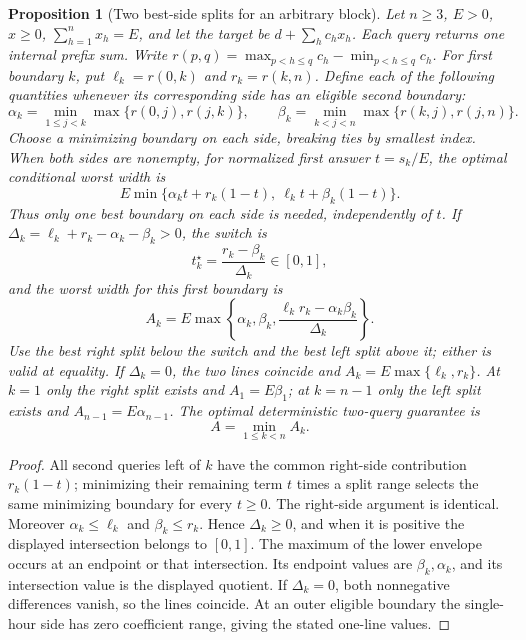 \documentclass[12pt]{article}
\newtheorem{proposition}{Proposition}
\begin{document}
\begin{proposition}[Two best-side splits for an arbitrary block]\label{prop:counter-two-query}
Let $n\geq3$, $E>0$, $x\geq0$, $\sum_{h=1}^n x_h=E$, and let the target be
$d+\sum_hc_hx_h$. Each query returns one internal prefix sum. Write
$r(p,q)=\max_{p<h\leq q}c_h-\min_{p<h\leq q}c_h$.
For first boundary $k$, put $\ell_k=r(0,k)$ and $r_k=r(k,n)$.
Define each of the following quantities whenever its corresponding
side has an eligible second boundary:
\[
 \alpha_k=\min_{1\leq j<k}\max\{r(0,j),r(j,k)\},\qquad
 \beta_k=\min_{k<j<n}\max\{r(k,j),r(j,n)\}.
\]
Choose a minimizing boundary on each side, breaking ties by smallest index.
When both sides are nonempty, for normalized first answer $t=s_k/E$,
the optimal conditional worst width is
\[
 E\min\{\alpha_k t+r_k(1-t),\ \ell_k t+\beta_k(1-t)\}.
\]
Thus only one best boundary on each side is needed, independently of $t$.
If $\Delta_k=\ell_k+r_k-\alpha_k-\beta_k>0$, the switch is
\[
 t_k^\star=\frac{r_k-\beta_k}{\Delta_k}\in[0,1],
\]
and the worst width for this first boundary is
\[
 A_k=E\max\left\{\alpha_k,\beta_k,
          \frac{\ell_kr_k-\alpha_k\beta_k}{\Delta_k}\right\}.
\]
Use the best right split below the switch and the best left split above
it; either is valid at equality. If $\Delta_k=0$, the two lines coincide
and $A_k=E\max\{\ell_k,r_k\}$. At $k=1$ only the right split exists and
$A_1=E\beta_1$; at $k=n-1$ only the left split exists and
$A_{n-1}=E\alpha_{n-1}$. The optimal deterministic two-query guarantee is
\begin{equation} A=\min_{1\leq k<n} A_k.\label{eq:counter-adaptive-value}\end{equation}
\end{proposition}
\begin{proof}
All second queries left of $k$ have the common right-side contribution
$r_k(1-t)$; minimizing their remaining term $t$ times a split range
selects the same minimizing boundary for every $t\geq0$. The right-side
argument is identical. Moreover $\alpha_k\leq\ell_k$ and
$\beta_k\leq r_k$. Hence $\Delta_k\geq0$, and when it is positive the
displayed intersection belongs to $[0,1]$. The maximum of the lower
envelope occurs at an endpoint or that intersection. Its endpoint
values are $\beta_k,\alpha_k$, and its intersection value is the displayed
quotient. If $\Delta_k=0$, both nonnegative differences vanish, so the
lines coincide. At an outer eligible boundary the single-hour side has
zero coefficient range, giving the stated one-line values.
\end{proof}
\end{document}
